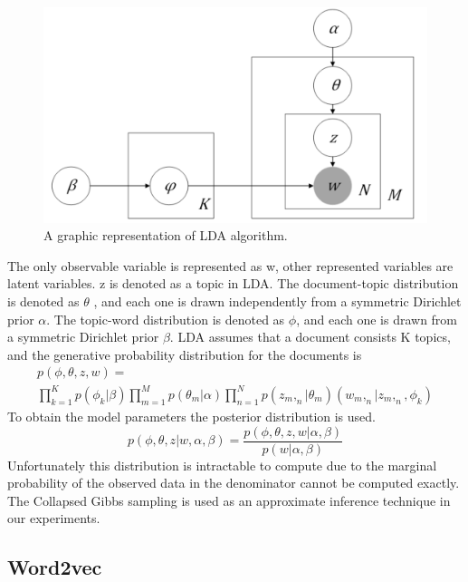 \documentclass[a4paper,fleqn]{cas-dc}
\begin{document}
\begin{figure}
	\centering
	\includegraphics[scale=.3]{figs/fig1.pdf}
	\caption{A graphic representation of LDA algorithm.}
	\label{fig1}
\end{figure}

The only observable variable is represented as w, other represented variables are latent variables. z is denoted as a topic in LDA. The document-topic distribution is denoted as $\theta$ , and each one is drawn independently from a symmetric Dirichlet prior $\alpha$. The topic-word distribution is denoted as $\phi$, and each one is drawn from a symmetric Dirichlet prior $\beta$. LDA assumes that a document consists K topics, and the generative probability distribution for the documents is
\begin{equation}
	\label{eq1}
	\begin{gathered}
		p(\phi,\theta,z,w) = \phantom{sbdabdsjhbadsada} \\
		\prod_{k=1}^{K}p(\phi_k |\beta) \prod_{m=1}^{M}p(\theta_m |\alpha) \prod_{n=1}^{N}p(z_m,_n|\theta_m) (w_m,_n |z_m,_n,\phi_k ) 
	\end{gathered}
\end{equation}
To obtain the model parameters the posterior distribution is used. 
\begin{equation}
\label{eq2}
p(\phi,\theta,z|w,\alpha,\beta)=  \frac{p(\phi,\theta,z,w|\alpha,\beta)}{p(w|\alpha,\beta)} 
\end{equation}
Unfortunately this distribution is intractable to compute due to the marginal probability of the observed data in the denominator cannot be computed exactly. The Collapsed Gibbs sampling is used as an approximate inference technique in our experiments. 

\subsection{Word2vec}
\end{document}
